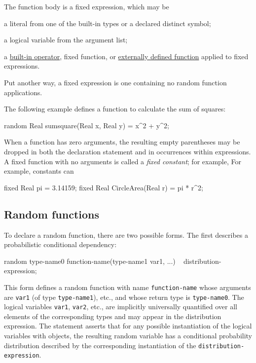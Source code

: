 \documentclass[12pt]{article}
\begin{document}
The function body is a fixed expression, which may be
\begin{itemize*}
\item a literal from one of the built-in types or a declared distinct symbol;
\item a logical variable from the argument list;
\item a \hyperref[builtin-operator-appendix]{built-in operator}, fixed function, or \hyperref[external-function-appendix]{externally defined function} applied to fixed expressions.
\end{itemize*}
Put another way, a fixed expression is one containing no random function applications.

The following example defines a function to calculate the sum of squares:
\begin{blogcode}
random Real sumsquare(Real x, Real y) = x^2 + y^2;
\end{blogcode}

When a function has zero arguments, the resulting empty parentheses may be dropped
in both the declaration statement and in occurrences within expressions.
A fixed function with no arguments is called a \emph{fixed constant}; for example,
For example, constants can 
\begin{blogcode}
fixed Real pi = 3.14159;
fixed Real CircleArea(Real r) = pi * r^2;
\end{blogcode}



\subsection{Random functions}\label{random-function-section}

To declare a random function, there are two possible forms. The first describes a probabilistic
conditional dependency:
\begin{blogcode}
random type-name0 function-name(type-name1 var1, ...) ~ distribution-expression;
\end{blogcode}
This form defines a random function with name \texttt{function-name} whose arguments are {\tt var1} (of type {\tt type-name1}), etc.,
and whose return type is \texttt{type-name0}. The logical variables {\tt var1}, {\tt var2}, etc., are implicitly universally quantified over
all elements of the corresponding types and may appear in the distribution expression. The statement asserts that for any possible instantiation of the
logical variables with objects, the resulting random variable has a conditional probability distribution
described by the corresponding instantiation of the {\tt distribution-expression}.
\end{document}
